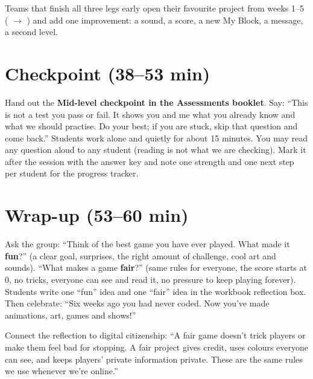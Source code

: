 \begin{freebuild}
Teams that finish all three legs early open their favourite project from weeks 1--5 ( $\rightarrow$ ) and add one improvement: a sound, a score, a new My Block, a message, a second level.
\end{freebuild}

\section{Checkpoint (38--53 min)}
\begin{teachernote}
Hand out the \textbf{Mid-level checkpoint in the Assessments booklet}. Say: \enquote{This is not a test you pass or fail. It shows you and me what you already know and what we should practise. Do your best; if you are stuck, skip that question and come back.} Students work alone and quietly for about 15 minutes. You may read any question aloud to any student (reading is not what we are checking). Mark it after the session with the answer key and note one strength and one next step per student for the progress tracker.
\end{teachernote}

\section{Wrap-up (53--60 min)}
\begin{reflection}
Ask the group: \enquote{Think of the best game you have ever played. What made it \textbf{fun}?} (a clear goal, surprises, the right amount of challenge, cool art and sounds). \enquote{What makes a game \textbf{fair}?} (same rules for everyone, the score starts at 0, no tricks, everyone can see and read it, no pressure to keep playing forever). Students write one \enquote{fun} idea and one \enquote{fair} idea in the workbook reflection box. Then celebrate: \enquote{Six weeks ago you had never coded. Now you've made animations, art, games and shows!}
\end{reflection}

\begin{safety}
Connect the reflection to digital citizenship: \enquote{A fair game doesn't trick players or make them feel bad for stopping. A fair project gives credit, uses colours everyone can see, and keeps players' private information private. These are the same rules we use whenever we're online.}
\end{safety}

